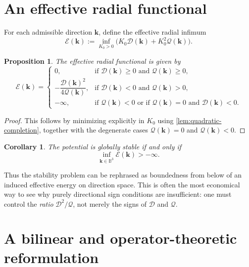 \documentclass[11pt,a4paper]{article}
\newtheorem{proposition}[definition]{Proposition}
\newtheorem{corollary}[definition]{Corollary}
\newcommand{\kk}{\bm{k}}
\newcommand{\cD}{\mathcal{D}} %
\newcommand{\cQ}{\mathcal{Q}}
\newcommand{\Sphere}{\mathbb{B}^3}
\begin{document}
	\section{An effective radial functional}
	
	For each admissible direction \(\kk\), define the effective radial infimum
	\begin{equation}\label{eq:effective-radial}
		\mathscr{E}(\kk):=\inf_{K_0>0}\bigl(K_0\cD(\kk)+K_0^2\cQ(\kk)\bigr).
	\end{equation}
	
	\begin{proposition}\label{prop:effective-energy}
		The effective radial functional is given by
		\[
		\mathscr{E}(\kk)=
		\begin{cases}
			0, & \text{if }\cD(\kk)\ge 0 \text{ and }\cQ(\kk)\ge 0,\\[0.5em]
			-\dfrac{\cD(\kk)^2}{4\cQ(\kk)}, & \text{if }\cD(\kk)<0 \text{ and }\cQ(\kk)>0,\\
			-\infty, & \text{if }\cQ(\kk)<0 \text{ or if } \cQ(\kk)=0 \text{ and }\cD(\kk)<0.
		\end{cases}
		\]
	\end{proposition}
	
	\begin{proof}
		This follows by minimizing explicitly in \(K_0\) using \cref{lem:quadratic-completion}, together with the degenerate cases \(\cQ(\kk)=0\) and \(\cQ(\kk)<0\).
	\end{proof}
	
	\begin{corollary}\label{cor:effective-energy-boundedness}
		The potential is globally stable if and only if
		\[
		\inf_{\kk\in\Sphere}\mathscr{E}(\kk)>-\infty.
		\]
	\end{corollary}
	
	Thus the stability problem can be rephrased as boundedness from below of an induced effective energy on direction space. This is often the most economical way to see why purely directional sign conditions are insufficient: one must control the \emph{ratio} \(\cD^2/\cQ\), not merely the signs of \(\cD\) and \(\cQ\).
	
	\section{A bilinear and operator-theoretic reformulation}
	
\end{document}
